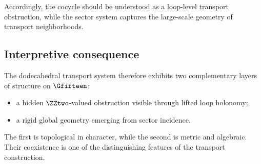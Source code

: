 Accordingly, the cocycle should be understood as a loop-level transport
obstruction, while the sector system captures the large-scale geometry of
transport neighborhoods.

\subsection{Interpretive consequence}

The dodecahedral transport system therefore exhibits two complementary
layers of structure on $\Gfifteen$:

\begin{itemize}
\item a hidden $\ZZtwo$-valued obstruction visible through lifted loop
holonomy;
\item a rigid global geometry emerging from sector incidence.
\end{itemize}

The first is topological in character, while the second is metric and
algebraic. Their coexistence is one of the distinguishing features of
the transport construction.
